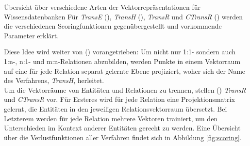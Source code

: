 \begin{table}[h]
{{\begin{multicols}{2}
  \end{multicols}
  }}
  \caption[Übersicht über verschiedene Arten der Vektorrepräsentationen für Wissensdatenbanken]{Übersicht über verschiedene Arten der Vektorrepräsentationen für Wissensdatenbanken
  Für \emph{TransE} (\cite{bordes2013translating}), \emph{TransH} (\cite{wang2014knowledge}), \emph{TransR} und \emph{CTransR} (\cite{lin2015learning})
  werden die verschiedenen Scoringfunktionen gegenübergestellt und vorkommende Parameter erklärt. \label{fig:scoring}}
\end{table}

Diese Idee wird weiter von (\cite{wang2014knowledge}) vorangetrieben: Um nicht nur 1:1- sondern auch 1:n-, n:1- und m:n-Relationen
abzubilden, werden Punkte in einem Vektorraum auf eine für jede Relation separat gelernte Ebene projiziert, woher sich
der Name des Verfahrens, \emph{TransH}, herleitet.\\
Um die Vektorräume von Entitäten und Relationen zu trennen, stellen (\cite{lin2015learning}) \emph{TransR} und \emph{CTransR}
vor. Für Ersteres wird für jede Relation eine Projektionsmatrix gelernt, die Entitäten in den jeweiligen Relationsvektorraum
übersetzt. Bei Letzterem werden für jede Relation mehrere Vektoren trainiert, um den Unterschieden im Kontext
anderer Entitäten gerecht zu werden. Eine Übersicht über die Verlustfunktionen aller Verfahren findet sich in Abbildung
\ref{fig:scoring}.
